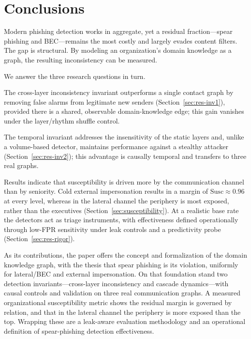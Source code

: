 \section{Conclusions}
\label{sec:conclusion}

Modern phishing detection works in aggregate, yet a residual fraction---spear phishing and BEC---remains the most costly and largely evades content filters. The gap is structural. By modeling an organization's domain knowledge as a graph, the resulting inconsistency can be measured.

We answer the three research questions in turn.
\begin{description}[noitemsep,topsep=2pt]
  \item[RQ1 (static signal, T1):] The cross-layer inconsistency invariant outperforms a single
  contact graph by removing false alarms from legitimate new senders (Section~\ref{sec:res-inv1}), provided there
  is a shared, observable domain-knowledge edge; this gain vanishes under the layer/rhythm shuffle control.
  \item[RQ2 (temporal signal, T2):] The temporal invariant addresses the insensitivity of the static layers and,
  unlike a volume-based detector, maintains performance against a stealthy attacker (Section~\ref{sec:res-inv2}); this
  advantage is causally temporal and transfers to three real graphs.
  \item[RQ3 (measurement, T3):] Results indicate that susceptibility is driven more by the communication channel than by seniority. Cold external impersonation
  results in a margin of $\mathrm{Susc}\!\approx\!0.96$ at every level, whereas in the lateral channel the
  periphery is most exposed, rather than the executives (Section~\ref{sec:susceptibility}). At a realistic base rate
  the detectors act as triage instruments, with effectiveness defined operationally through low-FPR sensitivity
  under leak controls and a predictivity probe (Section~\ref{sec:res-rigor}).
\end{description}

As its contributions, the paper offers the concept and formalization of the domain knowledge graph,
with the thesis that spear phishing is its violation, uniformly for lateral/BEC and external impersonation.
On that foundation stand two detection invariants---cross-layer inconsistency and cascade
dynamics---with causal controls and validation on three real communication graphs. A measured organizational
susceptibility metric shows the residual margin is governed by relation, and that in the lateral channel the
periphery is more exposed than the top. Wrapping these are a leak-aware evaluation methodology and an
operational definition of spear-phishing detection effectiveness.

